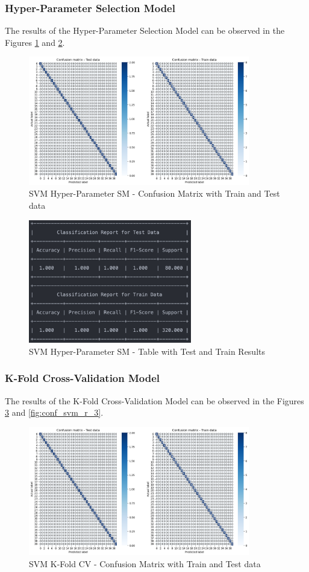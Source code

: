 \documentclass[conference]{IEEEtran}
\begin{document}
\subsubsection{Hyper-Parameter Selection Model}
The results of the Hyper-Parameter Selection Model can be observed in the Figures \ref{fig:conf_svm_2} and \ref{fig:conf_svm_r_2}.

\begin{figure}[H]
    \centering
    \includegraphics[width=3.8in]{SVC/2.png}%
    \caption{SVM Hyper-Parameter SM - Confusion Matrix with Train and Test data}%
    \label{fig:conf_svm_2}%
\end{figure}

\begin{figure}[H]
    \centering
    \includegraphics[width=2.8in]{SVC/r_2.png}%
    \caption{SVM Hyper-Parameter SM - Table with Test and Train Results}%
    \label{fig:conf_svm_r_2}%
\end{figure}

\subsubsection{K-Fold Cross-Validation Model}
The results of the K-Fold Cross-Validation Model can be observed in the Figures \ref{fig:conf_svm_3} and \ref{fig:conf_svm_r_3}. 

\begin{figure}[H]
    \centering
    \includegraphics[width=3.8in]{SVC/3.png}%
    \caption{SVM K-Fold CV - Confusion Matrix with Train and Test data}%
    \label{fig:conf_svm_3}%
\end{figure}
\end{document}
